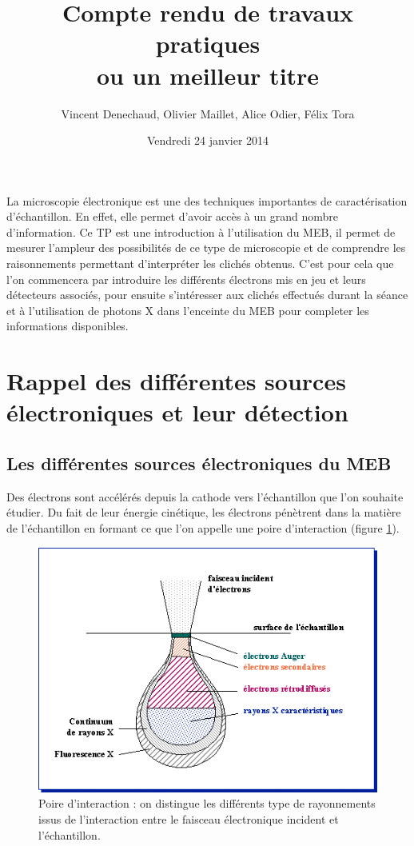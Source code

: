 \documentclass[a4paper,12pt]{article}
\title{Compte rendu de travaux pratiques\\ \small ou un meilleur titre}
\author{Vincent Denechaud, Olivier Maillet, Alice Odier, Félix Tora}
\date{Vendredi 24 janvier 2014}
\begin{document}
\maketitle

La microscopie électronique est une des techniques importantes de caractérisation d'échantillon. En effet, elle permet d'avoir accès à un grand nombre d'information. Ce TP est une introduction à l'utilisation du MEB, il permet de mesurer l'ampleur des possibilités de ce type de microscopie et de comprendre les raisonnements permettant d'interpréter les clichés obtenus. C'est pour cela que l'on commencera par introduire les différents électrons mis en jeu et leurs détecteurs associés, pour ensuite s'intéresser aux clichés effectués durant la séance et à l'utilisation de photons X dans l'enceinte du MEB pour completer les informations disponibles.


\section{Rappel des différentes sources électroniques et leur détection}

\subsection{Les différentes sources électroniques du MEB}

Des électrons sont accélérés depuis la cathode vers l'échantillon que l'on souhaite étudier. Du fait de leur énergie cinétique, les électrons pénètrent dans la matière de l'échantillon en formant ce que l'on appelle une poire d'interaction (figure \ref{fig:poire_int}).

\begin{figure}
\centering
\includegraphics[width = 0.8 \textwidth]{images/poire_int.png}
\caption{Poire d'interaction : on distingue les différents type de rayonnements issus de l'interaction entre le faisceau électronique incident et l'échantillon.}
\label{fig:poire_int}
\end{figure}
\end{document}
